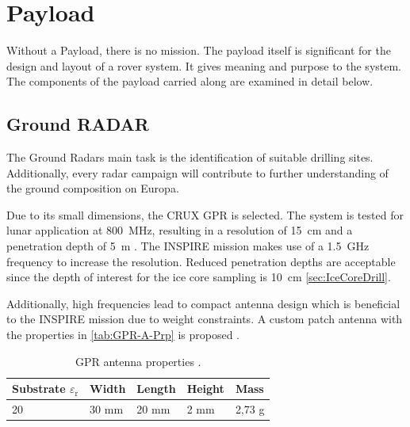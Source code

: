 
\chapter{Payload}
\label{chap:payload}

Without a Payload, there is no mission. The payload itself is significant for the design and layout of a rover system. It gives meaning and purpose to the system. The components of the payload carried along are examined in detail below. 

\section{Ground RADAR}
The Ground Radars main task is the identification of suitable drilling sites. Additionally, every radar campaign will contribute to further understanding of the ground composition on Europa.

Due to its small dimensions, the CRUX GPR is selected. The system is tested for lunar application at 800~MHz, resulting in a resolution of 15~cm and a penetration depth of 5~m \cite{CRUX_GPR}. The INSPIRE mission makes use of a 1.5~GHz frequency to increase the resolution. 
Reduced penetration depths are acceptable since the depth of interest for the ice core sampling is 10~cm \autoref{sec:IceCoreDrill}.

Additionally, high frequencies lead to compact antenna design which is beneficial to the INSPIRE mission due to weight constraints. 
A custom patch antenna with the properties in \autoref{tab:GPR-A-Prp} is proposed \cite{patch_ant_GPR, Patch_Ant_design}.

\begin{table}[h]
\centering
\begin{tabular}{lllll}
\toprule
Substrate ${\varepsilon}_\text{r}$ & Width & Length & Height & Mass   \\
\midrule
20                         & 30 mm & 20 mm  & 2 mm   & 2,73 g  \\
\bottomrule
\end{tabular}
\caption{GPR antenna properties \cite{Patch_Ant_design}.}
\label{tab:GPR-A-Prp}
\end{table}

